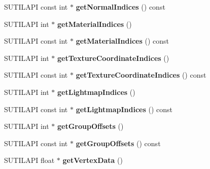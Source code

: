 \begin{DoxyCompactItemize}
\mbox{\label{class_mesh_storage_ad0c612c3550ee75581a34fe4fb5c6614}} 
S\+U\+T\+I\+L\+A\+PI const int $\ast$ {\bfseries get\+Normal\+Indices} () const
\item 
\mbox{\label{class_mesh_storage_aae43a9990be7da98e37c06b6ef226ae8}} 
S\+U\+T\+I\+L\+A\+PI int $\ast$ {\bfseries get\+Material\+Indices} ()
\item 
\mbox{\label{class_mesh_storage_ac2f7c46c4d409b662b97e9ac5767dc17}} 
S\+U\+T\+I\+L\+A\+PI const int $\ast$ {\bfseries get\+Material\+Indices} () const
\item 
\mbox{\label{class_mesh_storage_aaee63194bf9b7813f35084f1bd2005c6}} 
S\+U\+T\+I\+L\+A\+PI int $\ast$ {\bfseries get\+Texture\+Coordinate\+Indices} ()
\item 
\mbox{\label{class_mesh_storage_abfff683a09c90bc58aa8524dcbce657b}} 
S\+U\+T\+I\+L\+A\+PI const int $\ast$ {\bfseries get\+Texture\+Coordinate\+Indices} () const
\item 
\mbox{\label{class_mesh_storage_a7f5845ea5527951bc5c2062f0948f026}} 
S\+U\+T\+I\+L\+A\+PI int $\ast$ {\bfseries get\+Lightmap\+Indices} ()
\item 
\mbox{\label{class_mesh_storage_ab4e198c8518b693e973c0bef8e88b817}} 
S\+U\+T\+I\+L\+A\+PI const int $\ast$ {\bfseries get\+Lightmap\+Indices} () const
\item 
\mbox{\label{class_mesh_storage_a1fcc998e705dfdd40fa58c82a4db5ab4}} 
S\+U\+T\+I\+L\+A\+PI int $\ast$ {\bfseries get\+Group\+Offsets} ()
\item 
\mbox{\label{class_mesh_storage_aa60755752fd6f937c237d2df1deb9333}} 
S\+U\+T\+I\+L\+A\+PI const int $\ast$ {\bfseries get\+Group\+Offsets} () const
\item 
\mbox{\label{class_mesh_storage_ac0715938903b63734a8069ce5bf0cc1c}} 
S\+U\+T\+I\+L\+A\+PI float $\ast$ {\bfseries get\+Vertex\+Data} ()
\item 
\mbox{\label{class_mesh_storage_a369d2d1159c17331f71e10eb6535b793}} 

\end{DoxyCompactItemize}
